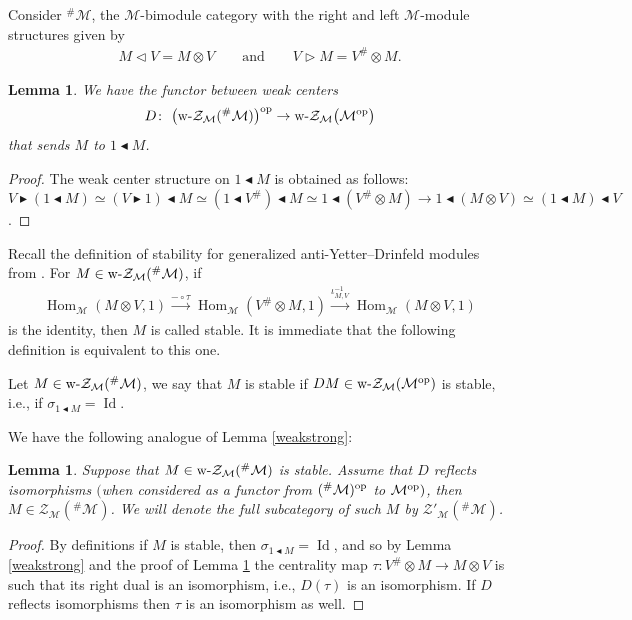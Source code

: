 \documentclass[10pt,a4paper]{amsart}
\newcommand{\Zc}{\mathcal{Z}}
\newcommand{\la}{\triangleright}
\newcommand{\ra}{\triangleleft}
\newcommand{\lab}{\blacktriangleright}
\newcommand{\rab}{\blacktriangleleft}
\def\ot{\otimes}
\numberwithin{equation}{section}
\newtheorem{Lemma}[Theorem]{Lemma}
 { \theoremstyle{definition}
\newtheorem{Definition}[Theorem]{Definition}
\newtheorem{Remark}[Theorem]{Remark} }
\begin{document}
 Consider ${^{\#}\mathcal{M}}$, the $\mathcal{M}$-bimodule category with the right and left $\mathcal{M}$-module structures given by
 \begin{gather*}
 M \ra V= M\otimes V \qquad \text{and} \qquad V \la M= V^\# \otimes M .
 \end{gather*}

 \begin{Lemma}\label{dfun}We have the functor between weak centers
\begin{gather*}
D\colon \ \big(\text{\rm w-}\Zc_{\mathcal{M}}({^{\#}\mathcal{M}})\big)^{\rm op}\to \text{\rm w-}\Zc_{\mathcal{M}}\big(\mathcal{M}^{\rm op}\big)
\end{gather*}
that sends $M$ to $1\rab M$.
 \end{Lemma}
 \begin{proof}
The weak center structure on $1\rab M$ is obtained as follows: $V\lab(1\rab M)\simeq (V\lab 1)\rab M\simeq (1\rab V^{\#})\rab M\simeq 1\rab(V^{\#}\ot M)\to 1\rab(M\ot V)\simeq(1\rab M)\rab V$.
 \end{proof}

 Recall the definition of stability for generalized anti-Yetter--Drinfeld modules from \cite{hks}. For $M\in\text{\rm w-}\Zc_{\mathcal{M}}({^{\#}\mathcal{M}})$, if \begin{gather*}
 \operatorname{Hom}_\mathcal{M}(M\otimes V,1) \xrightarrow{-\circ\tau} \operatorname{Hom}_\mathcal{M}(V^\# \otimes M,1) \xrightarrow{\iota^{-1}_{M,V}} \operatorname{Hom}_\mathcal{M}(M\otimes V,1)
 \end{gather*}
 is the identity, then $M$ is called stable. It is immediate that the following definition is equivalent to this one.

 \begin{Definition}\label{stab}
Let $M\in\text{\rm w-}\Zc_{\mathcal{M}}({^{\#}\mathcal{M}})$, we say that $M$ is stable if $DM\in\text{\rm w-}\Zc_{\mathcal{M}}(\mathcal{M}^{\rm op})$ is stable, i.e., if $\sigma_{1\rab M}=\operatorname{Id}$.
 \end{Definition}

 We have the following analogue of Lemma \ref{weakstrong}:

\begin{Lemma}Suppose that $M\in\text{\rm w-}\Zc_{\mathcal{M}}({^{\#}\mathcal{M}})$ is stable. Assume that $D$ reflects isomorphisms $($when considered as a functor from $({^{\#}\mathcal{M}})^{\rm op}$ to $\mathcal{M}^{\rm op})$, then $M\in\Zc_{\mathcal{M}}({^{\#}\mathcal{M}})$. We will denote the full subcategory of such $M$ by $\Zc'_{\mathcal{M}}({^{\#}\mathcal{M}})$.
 \end{Lemma}
\begin{proof}By definitions if $M$ is stable, then $\sigma_{1\rab M}=\operatorname{Id}$, and so by Lemma \ref{weakstrong} and the proof of Lemma \ref{dfun} the centrality map $\tau\colon V^{\#}\ot M\to M\ot V$ is such that its right dual is an isomorphism, i.e., $D(\tau)$ is an isomorphism. If $D$ reflects isomorphisms then $\tau$ is an isomorphism as well.
\end{proof}
\end{document}
